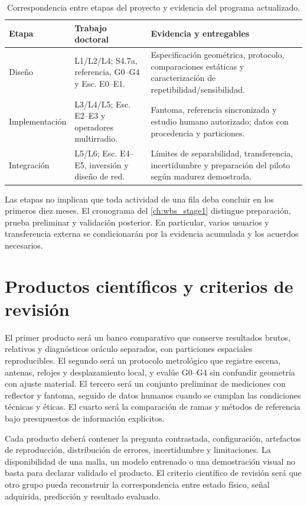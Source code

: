 \begin{table}[htbp]
\centering\small
\caption{Correspondencia entre etapas del proyecto y evidencia del programa actualizado.}
\label{tab:proposal_updated_mapping}
\begin{tabularx}{\textwidth}{P{3.0cm}L L}
\toprule
Etapa & Trabajo doctoral & Evidencia y entregables\\
\midrule
Diseño & L1/L2/L4; S4.7a, referencia, G0--G4 y Esc. E0--E1. & Especificación geométrica,
protocolo, comparaciones estáticas y caracterización de repetibilidad/sensibilidad.\\
Implementación & L3/L4/L5; Esc. E2--E3 y operadores multirradio. & Fantoma, referencia
sincronizada y estudio humano autorizado; datos con procedencia y particiones.\\
Integración & L5/L6; Esc. E4--E5, inversión y diseño de red. & Límites de separabilidad,
transferencia, incertidumbre y preparación del piloto según madurez demostrada.\\
\bottomrule
\end{tabularx}
\end{table}

Las etapas no implican que toda actividad de una fila deba concluir en los primeros
diez meses. El cronograma del \cref{ch:wbs_stage1} distingue preparación, prueba
preliminar y validación posterior. En particular, varios usuarios y transferencia
externa se condicionarán por la evidencia acumulada y los acuerdos necesarios.

\section{Productos científicos y criterios de revisión}

El primer producto será un banco comparativo que conserve resultados brutos, relativos
y diagnósticos oráculo separados, con particiones espaciales reproducibles. El segundo
será un protocolo metrológico que registre escena, antenas, relojes y desplazamiento
local, y evalúe G0--G4 sin confundir geometría con ajuste material. El tercero será
un conjunto preliminar de mediciones con reflector y fantoma, seguido de datos humanos
cuando se cumplan las condiciones técnicas y éticas. El cuarto será la comparación
de ramas y métodos de referencia bajo presupuestos de información explícitos.

Cada producto deberá contener la pregunta contrastada, configuración, artefactos de
reproducción, distribución de errores, incertidumbre y limitaciones. La disponibilidad
de una malla, un modelo entrenado o una demostración visual no basta para declarar
validado el producto. El criterio científico de revisión será que otro grupo pueda
reconstruir la correspondencia entre estado físico, señal adquirida, predicción y
resultado evaluado.


